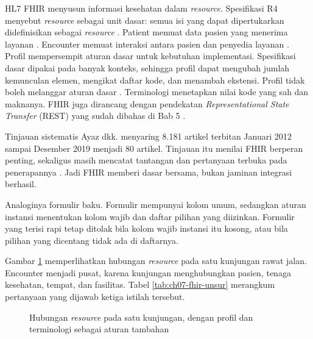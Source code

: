 HL7 FHIR menyusun informasi kesehatan dalam \textit{resource}. Spesifikasi R4 menyebut \textit{resource} sebagai unit
dasar: semua isi yang dapat dipertukarkan didefinisikan sebagai \textit{resource} \cite{c07-fhir-overview}. Patient
memuat data pasien yang menerima layanan \cite{c07-fhir-patient}. Encounter memuat interaksi antara pasien dan
penyedia layanan \cite{c07-fhir-encounter}. Profil mempersempit aturan dasar untuk kebutuhan implementasi. Spesifikasi
dasar dipakai pada banyak konteks, sehingga profil dapat mengubah jumlah kemunculan elemen, mengikat daftar kode, dan
menambah ekstensi. Profil tidak boleh melanggar aturan dasar \cite{c07-fhir-profiling}. Terminologi menetapkan nilai
kode yang sah dan maknanya. FHIR juga dirancang dengan pendekatan \textit{Representational State Transfer} (REST) yang
sudah dibahas di Bab 5 \cite{c07-bender2013}.

Tinjauan sistematis Ayaz dkk. menyaring 8.181 artikel terbitan Januari 2012 sampai Desember 2019 menjadi 80 artikel.
Tinjauan itu menilai FHIR berperan penting, sekaligus masih mencatat tantangan dan pertanyaan terbuka pada
penerapannya \cite{c07-ayaz2021}. Jadi FHIR memberi dasar bersama, bukan jaminan integrasi berhasil.

Analoginya formulir baku. Formulir mempunyai kolom umum, sedangkan aturan instansi menentukan kolom wajib dan daftar
pilihan yang diizinkan. Formulir yang terisi rapi tetap ditolak bila kolom wajib instansi itu kosong, atau bila
pilihan yang dicentang tidak ada di daftarnya.

Gambar \ref{fig:ch07-anatomi} memperlihatkan hubungan \textit{resource} pada satu kunjungan rawat jalan. Encounter
menjadi pusat, karena kunjungan menghubungkan pasien, tenaga kesehatan, tempat, dan fasilitas. Tabel
\ref{tab:ch07-fhir-unsur} merangkum pertanyaan yang dijawab ketiga istilah tersebut.

\begin{figure}[!htb]
  \centering
  
  \caption{Hubungan \textit{resource} pada satu kunjungan, dengan profil dan terminologi sebagai aturan tambahan}
  \label{fig:ch07-anatomi}
\end{figure}


